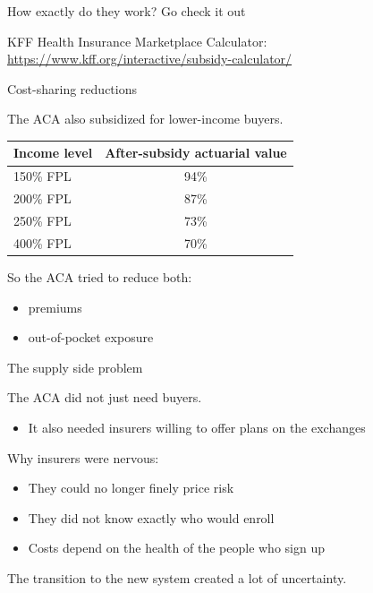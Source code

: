 \begin{frame}{How exactly do they work? Go check it out}

    KFF Health Insurance Marketplace Calculator: \href{https://www.kff.org/interactive/subsidy-calculator/}{https://www.kff.org/interactive/subsidy-calculator/}

\end{frame}
\begin{frame}{Cost-sharing reductions}

    The ACA also subsidized  for lower-income buyers.

    \begin{center}
    \begin{tabular}{lc}
        \toprule
        Income level & After-subsidy actuarial value \\
        \midrule
        150\% FPL & 94\% \\
        200\% FPL & 87\% \\
        250\% FPL & 73\% \\
        400\% FPL & 70\% \\
        \bottomrule
    \end{tabular}
    \end{center}

    \vspace{2mm}

    So the ACA tried to reduce both:
    \begin{itemize}
        \item premiums
        \item out-of-pocket exposure
    \end{itemize}

\end{frame}
\begin{frame}{The supply side problem}

    The ACA did not just need buyers.
    \begin{itemize}
        \item It also needed insurers willing to offer plans on the exchanges
    \end{itemize}

    \vspace{3mm}

    Why insurers were nervous:
    \begin{itemize}
        \item They could no longer finely price risk
        \item They did not know exactly who would enroll
        \item Costs depend on the health of the people who sign up
    \end{itemize}

    \vspace{3mm}

    The transition to the new system created a lot of uncertainty.

\end{frame}

